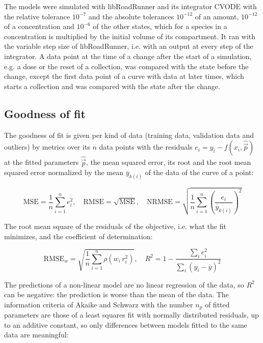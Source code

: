 \documentclass{article}
\begin{document}
The models were simulated with libRoadRunner \cite{Welsh2023} and its integrator CVODE \cite{Hindmarsh2005} with the relative tolerance $10^{-7}$ and the absolute tolerances $10^{-12}$ of an amount, $10^{-12}$ of a concentration and $10^{-6}$ of the other states, which for a species in a concentration is multiplied by the initial volume of its compartment. It ran with the variable step size of libRoadRunner, i.e. with an output at every step of the integrator. A data point at the time of a change after the start of a simulation, e.g. a dose or the reset of a collection, was compared with the state before the change, except the first data point of a curve with data at later times, which starts a collection and was compared with the state after the change.

\subsection{Goodness of fit}

The goodness of fit is given per kind of data (training data, validation data and outliers) by metrics over its $n$ data points with the residuals $e_i = y_i - f(x_i, \hat{\vec{p}})$ at the fitted parameters $\hat{\vec{p}}$, the mean squared error, its root and the root mean squared error normalized by the mean $\overline{y}_{k(i)}$ of the data of the curve of a point:

\begin{equation}
\mathrm{MSE} = \frac{1}{n} \sum_{i=1}^{n} e_i^2, \quad \mathrm{RMSE} = \sqrt{\mathrm{MSE}}, \quad \mathrm{NRMSE} = \sqrt{\frac{1}{n} \sum_{i=1}^{n} \left(\frac{e_i}{\overline{y}_{k(i)}}\right)^2}
\end{equation}

The root mean square of the residuals of the objective, i.e. what the fit minimizes, and the coefficient of determination:

\begin{equation}
\mathrm{RMSE}_w = \sqrt{\frac{1}{n} \sum_{i=1}^{n} \rho\left(w_i\, r_i^2\right)}, \quad R^2 = 1 - \frac{\sum_{i} e_i^2}{\sum_{i} \left(y_i - \overline{y}\right)^2}
\end{equation}

The predictions of a non-linear model are no linear regression of the data, so $R^2$ can be negative: the prediction is worse than the mean of the data. The information criteria of Akaike \cite{Akaike1974} and Schwarz \cite{Schwarz1978} with the number $n_p$ of fitted parameters are those of a least squares fit with normally distributed residuals, up to an additive constant, so only differences between models fitted to the same data are meaningful:
\end{document}
